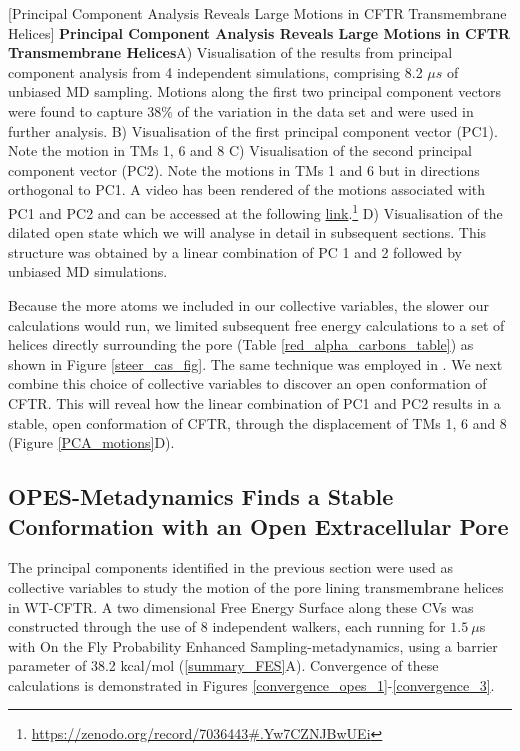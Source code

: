 	[Principal Component Analysis Reveals Large Motions in CFTR Transmembrane Helices] {\textbf{Principal Component Analysis Reveals Large Motions in CFTR Transmembrane Helices}}{A) Visualisation of the results from principal component analysis from 4 independent simulations, comprising 8.2 $\mu s$ of unbiased MD sampling. Motions along the first two principal component vectors were found to capture 38\% of the variation in the data set and were used in further analysis. B) Visualisation of the first principal component vector (PC1). Note the motion in TMs 1, 6 and 8 C) Visualisation of the second principal component vector (PC2). Note the motions in TMs 1 and 6 but in directions orthogonal to PC1. A video has been rendered of the motions associated with PC1 and PC2 and can be accessed at the following \href{https://zenodo.org/record/7036443#.Yw7CZNJBwUE}{link}.\footnote{\href{https://zenodo.org/record/7036443\#.Yw7CZNJBwUEi}{https://zenodo.org/record/7036443\#.Yw7CZNJBwUEi}} D) Visualisation of the dilated open state which we will analyse in detail in subsequent sections. This structure was obtained by a linear combination of PC 1 and 2 followed by unbiased MD simulations. } 
	\label{PCA_motions}
	\endgroup

Because the more atoms we included in our collective variables, the slower our calculations would run, we limited subsequent free energy calculations to a set of helices directly surrounding the pore (Table \ref{red_alpha_carbons_table}) as shown in Figure \ref{steer_cas_fig}. The same technique was employed in \cite{hoffmann2018}. We next combine this choice of collective variables to discover an open conformation of CFTR. This will reveal how the linear combination of PC1 and PC2 results in a stable, open conformation of CFTR, through the displacement of TMs 1, 6 and 8 (Figure \ref{PCA_motions}D). 

\subsection{OPES-Metadynamics Finds a Stable Conformation with an Open Extracellular Pore}

The principal components identified in the previous section were used as collective variables to study the motion of the pore lining transmembrane helices in WT-CFTR. A two dimensional Free Energy Surface along these CVs was constructed through the use of 8 independent walkers, each running for $1.5~\mu$s with On the Fly Probability Enhanced Sampling-metadynamics, using a barrier parameter of 38.2 kcal/mol (\ref{summary_FES}A). Convergence of these calculations is demonstrated in Figures \ref{convergence_opes_1}-\ref{convergence_3}. 

